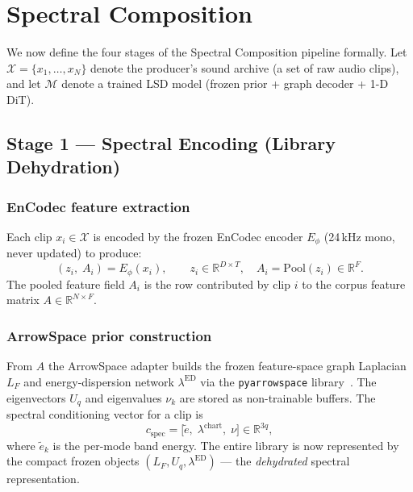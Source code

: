 \documentclass[12pt,a4paper]{article}
\begin{document}
\section{Spectral Composition}
\label{sec:method}

We now define the four stages of the Spectral Composition pipeline
formally. Let $\mathcal{X} = \{x_1, \ldots, x_N\}$ denote the producer's
sound archive (a set of raw audio clips), and let $\mathcal{M}$ denote a
trained LSD model (frozen prior + graph decoder + 1-D DiT).

\subsection{Stage 1 — Spectral Encoding (Library Dehydration)}
\label{subsec:stage1}

\subsubsection{EnCodec feature extraction}

Each clip $x_i \in \mathcal{X}$ is encoded by the frozen EnCodec encoder
$E_\phi$ (24\,kHz mono, never updated) to produce:
\begin{equation}
  (z_i,\; A_i) = E_\phi(x_i),
  \qquad
  z_i \in \mathbb{R}^{D \times T},\quad
  A_i = \mathrm{Pool}(z_i) \in \mathbb{R}^F.
  \label{eq:encodec}
\end{equation}
The pooled feature field $A_i$ is the row contributed by clip $i$ to the
corpus feature matrix $A \in \mathbb{R}^{N \times F}$.

\subsubsection{ArrowSpace prior construction}

From $A$ the ArrowSpace adapter builds the frozen feature-space graph
Laplacian $L_F$ and energy-dispersion network $\lambda^{\mathrm{ED}}$
via the \texttt{pyarrowspace} library~\cite{pyarrowspace}. The eigenvectors
$U_q$ and eigenvalues $\nu_k$ are stored as non-trainable buffers. The
spectral conditioning vector for a clip is
\begin{equation}
  c_{\mathrm{spec}} =
  \bigl[\tilde{e},\; \lambda^{\mathrm{chart}},\; \nu\bigr]
  \in \mathbb{R}^{3q},
  \label{eq:cspec}
\end{equation}
where $\tilde{e}_k$ is the per-mode band energy. The entire library is
now represented by the compact frozen objects
$(L_F, U_q, \lambda^{\mathrm{ED}})$ — the \emph{dehydrated} spectral
representation.
\end{document}
